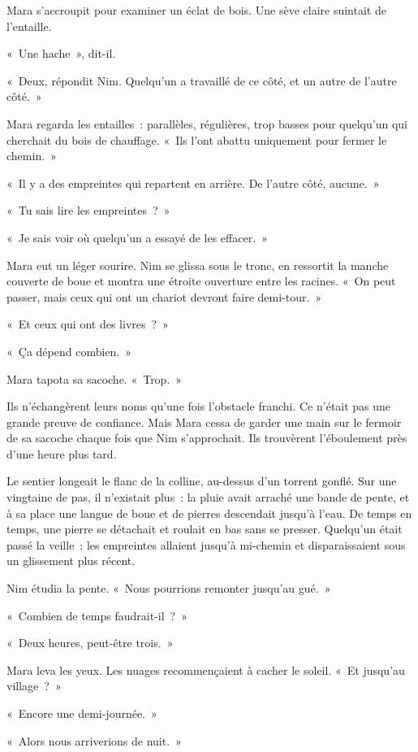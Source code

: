\documentclass[10pt,a4paper]{article}
\begin{document}
Mara s’accroupit pour examiner un éclat de bois. Une sève claire suintait de l’entaille.

«~Une hache~», dit-il.

«~Deux, répondit Nim. Quelqu’un a travaillé de ce côté, et un autre de l’autre côté.~»

Mara regarda les entailles~: parallèles, régulières, trop basses pour quelqu’un qui cherchait du bois de chauffage. «~Ils l’ont abattu uniquement pour fermer le chemin.~»

«~Il y a des empreintes qui repartent en arrière. De l’autre côté, aucune.~»

«~Tu sais lire les empreintes~?~»

«~Je sais voir où quelqu’un a essayé de les effacer.~»

Mara eut un léger sourire. Nim se glissa sous le tronc, en ressortit la manche couverte de boue et montra une étroite ouverture entre les racines. «~On peut passer, mais ceux qui ont un chariot devront faire demi-tour.~»

«~Et ceux qui ont des livres~?~»

«~Ça dépend combien.~»

Mara tapota sa sacoche. «~Trop.~»

Ils n’échangèrent leurs noms qu’une fois l’obstacle franchi. Ce n’était pas une grande preuve de confiance. Mais Mara cessa de garder une main sur le fermoir de sa sacoche chaque fois que Nim s’approchait.
Ils trouvèrent l’éboulement près d’une heure plus tard.

Le sentier longeait le flanc de la colline, au-dessus d’un torrent gonflé. Sur une vingtaine de pas, il n’existait plus~: la pluie avait arraché une bande de pente, et à sa place une langue de boue et de pierres descendait jusqu’à l’eau. De temps en temps, une pierre se détachait et roulait en bas sans se presser. Quelqu’un était passé la veille~: les empreintes allaient jusqu’à mi-chemin et disparaissaient sous un glissement plus récent.

Nim étudia la pente. «~Nous pourrions remonter jusqu’au gué.~»

«~Combien de temps faudrait-il~?~»

«~Deux heures, peut-être trois.~»

Mara leva les yeux. Les nuages recommençaient à cacher le soleil. «~Et jusqu’au village~?~»

«~Encore une demi-journée.~»

«~Alors nous arriverions de nuit.~»
\end{document}
